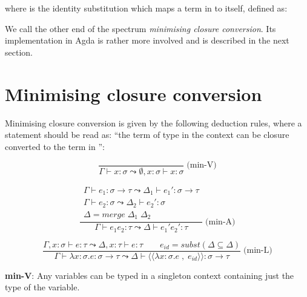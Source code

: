 \documentclass[bsc,frontabs,oneside,singlespacing,parskip,deptreport]{infthesis}
\theoremstyle{definition}
\theoremstyle{lemma}
\begin{document}

where  is the identity substitution which maps a term
in  to itself, defined as:


We call the other end of the spectrum \textit{minimising closure
  conversion}. Its implementation in Agda is rather more involved and
is described in the next section.

\section{Minimising closure conversion}
\label{sec:minim-clos-conv}

Minimising closure conversion is given by the following deduction
rules, where a statement  should be read as:
``the term  of type  in the context  can be closure
converted to the term  in '':

\begin{minipage}{.5\textwidth}
  \[
    \frac
    {}
    {\Gamma \vdash x : \sigma \leadsto \emptyset , x : \sigma \vdash x : \sigma}
    \;\text{(min-V)}
  \]
\end{minipage}%
\begin{minipage}{.5\textwidth}
  \[
    \frac
    {
      \begin{matrix}
        \Gamma \vdash e_1 : \sigma \to \tau \leadsto \Delta_1 \vdash
        e_1' : \sigma \to \tau \\
        \Gamma \vdash e_2 : \sigma \leadsto \Delta_2 \vdash e_2' :
        \sigma \\
        \Delta = merge \; \Delta_1 \; \Delta_2
      \end{matrix}
      }
    {\Gamma ⊢ e_1 e_2 : \tau  \leadsto \Delta  \vdash e_1' e_2' : \tau}
     \;\text{(min-A)}
  \]
\end{minipage}

\[
  \frac {\Gamma , x : \sigma ⊢ e : \tau \leadsto \Delta , x : \tau
    \vdash e : \tau \quad \quad e_{id} = subst ( \Delta \subseteq
    \Delta )}
  {\Gamma \vdash \lambda x : \sigma . e : \sigma \to \tau \leadsto
    \Delta \vdash \langle\langle \lambda x : \sigma . e \; , \; e_{id}
    \rangle\rangle : \sigma \to \tau} \; \text{(min-L)}
\]

\textbf{min-V}: Any variables can be typed in a singleton context
containing just the type of the variable.
\end{document}
